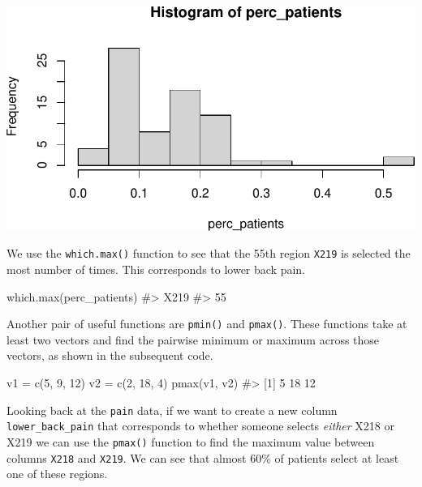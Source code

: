 \documentclass[
  letterpaper,
]{latex/krantz}
\makeatletter
\newenvironment{Shaded}{\begin{snugshade}}{\end{snugshade}}
\newcommand{\CommentTok}[1]{\textcolor[rgb]{0.37,0.37,0.37}{#1}}
\newcommand{\DecValTok}[1]{\textcolor[rgb]{0.68,0.00,0.00}{#1}}
\newcommand{\FunctionTok}[1]{\textcolor[rgb]{0.28,0.35,0.67}{#1}}
\newcommand{\NormalTok}[1]{\textcolor[rgb]{0.00,0.23,0.31}{#1}}
\newcommand{\OtherTok}[1]{\textcolor[rgb]{0.00,0.23,0.31}{#1}}
\newenvironment{kframe}{%
\medskip{}
\setlength{\fboxsep}{.8em}
 \def\at@end@of@kframe{}%
 \ifinner\ifhmode%
  \def\at@end@of@kframe{\end{minipage}}%
  \begin{minipage}{\columnwidth}%
 \fi\fi%
 \def\FrameCommand##1{\hskip\@totalleftmargin \hskip-\fboxsep
 \colorbox{shadecolor}{##1}\hskip-\fboxsep
     \hskip-\linewidth \hskip-\@totalleftmargin \hskip\columnwidth}%
 \MakeFramed {\advance\hsize-\width
   \@totalleftmargin\z@ \linewidth\hsize
   \@setminipage}}%
 {\par\unskip\endMakeFramed%
 \at@end@of@kframe}
\renewenvironment{Shaded}{\begin{kframe}}{\end{kframe}}
\makeatother
\begin{document}
\begin{center}
\includegraphics[width=1\textwidth,height=\textheight]{book/working_data_files_files/figure-pdf/unnamed-chunk-21-1.pdf}
\end{center}

We use the \texttt{which.max()} function to see that the 55th region
\texttt{X219} is selected the most number of times. This corresponds to
lower back pain.

\begin{Shaded}
\begin{Highlighting}[]
\FunctionTok{which.max}\NormalTok{(perc\_patients)}
\CommentTok{\#\textgreater{} X219 }
\CommentTok{\#\textgreater{}   55}
\end{Highlighting}
\end{Shaded}

Another pair of useful functions are
\texttt{pmin()} and
\texttt{pmax()}. These
functions take at least two vectors and find the pairwise minimum or
maximum across those vectors, as shown in the subsequent code.

\begin{Shaded}
\begin{Highlighting}[]
\NormalTok{v1 }\OtherTok{=} \FunctionTok{c}\NormalTok{(}\DecValTok{5}\NormalTok{, }\DecValTok{9}\NormalTok{, }\DecValTok{12}\NormalTok{)}
\NormalTok{v2 }\OtherTok{=} \FunctionTok{c}\NormalTok{(}\DecValTok{2}\NormalTok{, }\DecValTok{18}\NormalTok{, }\DecValTok{4}\NormalTok{)}
\FunctionTok{pmax}\NormalTok{(v1, v2)  }
\CommentTok{\#\textgreater{} [1]  5 18 12}
\end{Highlighting}
\end{Shaded}

Looking back at the \texttt{pain} data, if we want to create a new
column \texttt{lower\_back\_pain} that corresponds to whether someone
selects \emph{either} X218 or X219 we can use the \texttt{pmax()}
function to find the maximum value between columns \texttt{X218} and
\texttt{X219}. We can see that almost 60\% of patients select at least
one of these regions.
\end{document}
